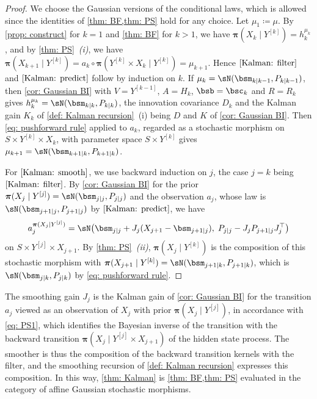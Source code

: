 \documentclass[12pt,reqno]{amsart}%
\theoremstyle{plain}
\theoremstyle{definition}
\def\bspi{\boldsymbol{\pi}}
\begin{document}
\begin{proof}
	We choose the Gaussian versions of the conditional laws, which is allowed since the
	identities of \cref{thm: BF,thm: PS} hold for any choice.
	Let $\mu_1\coloneqq\mu$.  By \cref{prop: construct} for $k=1$ and \cref{thm: BF} for $k>1$, we have
	$\bspi(X_k\mid Y^{[k]})=h_k^{\mu_k}$, and by \cref{thm: PS}~\textit{(i)}, we have
	$\bspi(X_{k+1}\mid Y^{[k]})=a_k\circ\bspi(Y^{[k]}\times X_k\mid Y^{[k]})=\mu_{k+1}$.
	Hence $\ref{Kalman: filter}$ and $\ref{Kalman: predict}$ follow by induction on $k$.
	If $\mu_k=\sN(\bsm_{k\mid k-1},P_{k\mid k-1})$, then \cref{cor: Gaussian BI}
	with $V=Y^{[k-1]}$, $A=H_k$, $\bsb=\bsc_k$ and $R=R_k$ gives
	$h_k^{\mu_k}=\sN(\bsm_{k\mid k},P_{k\mid k})$,
	the innovation covariance $D_k$ and the Kalman gain $K_k$ of \cref{def: Kalman recursion}~(i)
	being $D$ and $K$ of \cref{cor: Gaussian BI}.
	Then \eqref{eq: pushforward rule} applied to
	$a_k$, regarded as a stochastic morphism on $S\times Y^{[k]}\times X_k$, with parameter space $S\times Y^{[k]}$ gives
	$\mu_{k+1}=\sN(\bsm_{k+1\mid k},P_{k+1\mid k})$.

	For $\ref{Kalman: smooth}$, we use backward induction on $j$, the case $j=k$ being 
	$\ref{Kalman: filter}$.
	By \cref{cor: Gaussian BI} for the prior $\bspi(X_j\mid Y^{[j]})=\sN(\bsm_{j\mid j},P_{j\mid j})$ and the
	observation $a_j$, whose law is $\sN(\bsm_{j+1\mid j},P_{j+1\mid j})$ by $\ref{Kalman: predict}$, we have
	\[
		a_j^{\bspi(X_j\mid Y^{[j]})}=\sN\bigl(\bsm_{j\mid j}+J_j(X_{j+1}-\bsm_{j+1\mid j}),\;P_{j\mid j}-J_jP_{j+1\mid j}J_j^{\top}\bigr)
	\]
	on $S\times Y^{[j]}\times X_{j+1}$.  By \cref{thm: PS}~\textit{(ii)}, $\bspi(X_j\mid Y^{[k]})$ is the
	composition of this stochastic morphism with $\bspi(X_{j+1}\mid Y^{[k]})=\sN(\bsm_{j+1\mid k},P_{j+1\mid k})$,
	which is $\sN(\bsm_{j\mid k},P_{j\mid k})$ by \eqref{eq: pushforward rule}.
\end{proof}

\begin{remark}
	The smoothing gain $J_j$ is the Kalman gain of \cref{cor: Gaussian BI} for the transition $a_j$ viewed as an observation
	of $X_j$ with prior $\bspi(X_j\mid Y^{[j]})$, in accordance with \eqref{eq: PS1},
	which identifies the Bayesian inverse of the transition with the backward transition
	$\bspi(X_j\mid Y^{[j]}\times X_{j+1})$ of the hidden state process.
	The smoother is thus the composition of the backward transition kernels with the filter, and the
	smoothing recursion of \cref{def: Kalman recursion} expresses this composition.
	In this way, \cref{thm: Kalman} is \cref{thm: BF,thm: PS} evaluated in the category of affine Gaussian
	stochastic morphisms.
\end{remark}
\end{document}
